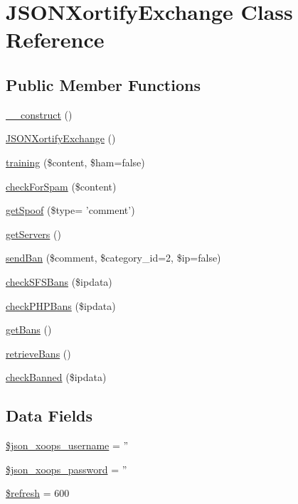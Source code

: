 \hypertarget{class_j_s_o_n_xortify_exchange}{\section{J\-S\-O\-N\-Xortify\-Exchange Class Reference}
\label{class_j_s_o_n_xortify_exchange}
}
\subsection*{Public Member Functions}
\begin{DoxyCompactItemize}
\item 
\hyperlink{class_j_s_o_n_xortify_exchange_a095c5d389db211932136b53f25f39685}{\-\_\-\-\_\-construct} ()
\item 
\hyperlink{class_j_s_o_n_xortify_exchange_a5b94fbd0db11c88aaac5a4d6025957c5}{J\-S\-O\-N\-Xortify\-Exchange} ()
\item 
\hyperlink{class_j_s_o_n_xortify_exchange_a3b3be735e633ba330c6b5d086aa508cd}{training} (\$content, \$ham=false)
\item 
\hyperlink{class_j_s_o_n_xortify_exchange_a7a4f53c3841dc7806455261af557d514}{check\-For\-Spam} (\$content)
\item 
\hyperlink{class_j_s_o_n_xortify_exchange_ae7926cba79660f77479306100f492c03}{get\-Spoof} (\$type= 'comment')
\item 
\hyperlink{class_j_s_o_n_xortify_exchange_a882f365bc81e207dc2123ef707735e82}{get\-Servers} ()
\item 
\hyperlink{class_j_s_o_n_xortify_exchange_a0293acfa4afe0cb5b2816352a35d8ca7}{send\-Ban} (\$comment, \$category\-\_\-id=2, \$ip=false)
\item 
\hyperlink{class_j_s_o_n_xortify_exchange_a985a563a84e3e5c54694fcce192bda53}{check\-S\-F\-S\-Bans} (\$ipdata)
\item 
\hyperlink{class_j_s_o_n_xortify_exchange_aeb1bf9aaee4718870adbd07333490aaf}{check\-P\-H\-P\-Bans} (\$ipdata)
\item 
\hyperlink{class_j_s_o_n_xortify_exchange_aea26db2906896833d32445a698fc4cdc}{get\-Bans} ()
\item 
\hyperlink{class_j_s_o_n_xortify_exchange_a4af29af927aae9aada97ef0c2cd08fa1}{retrieve\-Bans} ()
\item 
\hyperlink{class_j_s_o_n_xortify_exchange_ae41df0f26620b727f7f63342648f6474}{check\-Banned} (\$ipdata)
\end{DoxyCompactItemize}
\subsection*{Data Fields}
\begin{DoxyCompactItemize}
\item 
\hyperlink{class_j_s_o_n_xortify_exchange_ac058687d82a56fb93513e7e58c4ec391}{\$json\-\_\-xoops\-\_\-username} = ''
\item 
\hyperlink{class_j_s_o_n_xortify_exchange_a7af311f07c1c09254920e6ac0cefe9a9}{\$json\-\_\-xoops\-\_\-password} = ''
\item 
\hyperlink{class_j_s_o_n_xortify_exchange_a8527f826b6959aaa92b0e51ee427ba1a}{\$refresh} = 600
\end{DoxyCompactItemize}


